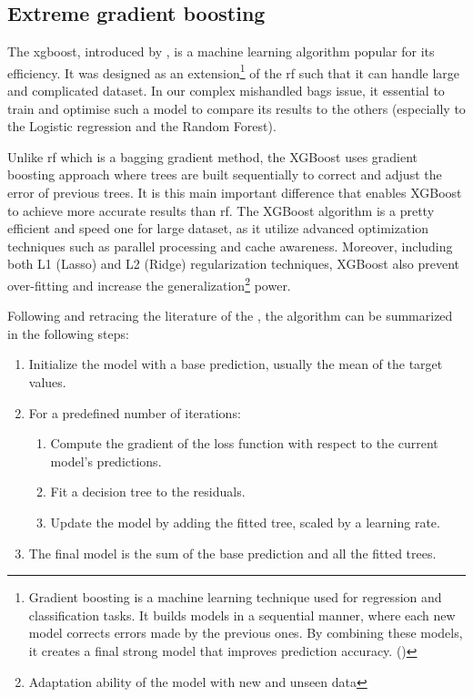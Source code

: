 \documentclass[12pt]{article}
\begin{document}
\subsection{Extreme gradient boosting}
\label{subsec:Extreme Gradient Boosting}

The \acrlong{xgboost}, introduced by \cite{https://arxiv.org/pdf/1603.02754}, is a machine learning algorithm popular for its efficiency. It was designed as an extension\footnote{Gradient boosting is a machine learning technique used for regression and classification tasks. It builds models in a sequential manner, where each new model corrects errors made by the previous ones. By combining these models, it creates a final strong model that improves prediction accuracy. (\cite{Friedman2001})} of the \acrshort{rf} such that it can handle large and complicated dataset. In our complex mishandled bags issue, it essential to train and optimise such a model to compare its results to the others (especially to the Logistic regression and the Random Forest).

Unlike \acrshort{rf} which is a bagging gradient method, the XGBoost uses gradient boosting approach where trees are built sequentially to correct and adjust the error of previous trees. It is this main important difference that enables XGBoost to achieve more accurate results than \acrshort{rf}. The XGBoost algorithm is a pretty efficient and speed one for large dataset, as it utilize advanced optimization techniques such as parallel processing and cache awareness. Moreover, including both L1 (Lasso) and L2 (Ridge) regularization techniques, XGBoost also prevent over-fitting and increase the generalization\footnote{Adaptation ability of the model with new and unseen data} power. \hfill \break


Following and retracing the literature of the \cite{IntroductionToBoostedTrees}, the algorithm can be summarized in the following steps:
 
\begin{enumerate}
    \item Initialize the model with a base prediction, usually the mean of the target values. 
    \item For a predefined number of iterations:
    \begin{enumerate}
        \item Compute the gradient of the loss function with respect to the current model's predictions.
        \item Fit a decision tree to the residuals.
        \item Update the model by adding the fitted tree, scaled by a learning rate.
    \end{enumerate}
    \item The final model is the sum of the base prediction and all the fitted trees.
\end{enumerate}
\end{document}
